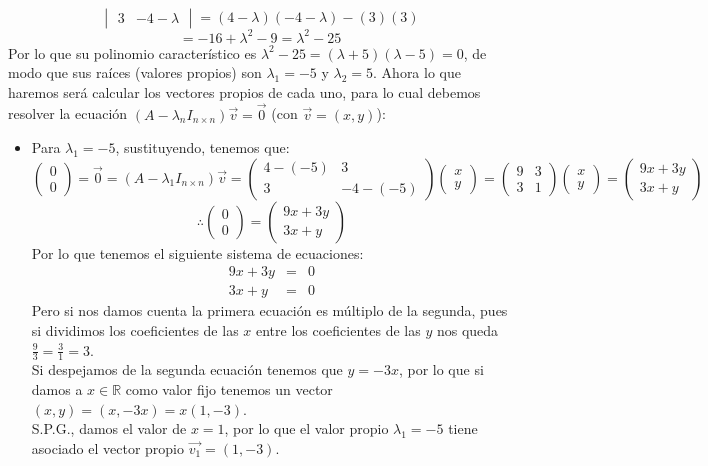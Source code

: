 \begin{itemize}
\[\begin{vmatrix}
3 &-4-\lambda\end{vmatrix}=(4-\lambda)(-4-\lambda)-(3)(3)\]\[=-16+\lambda^2-9=\lambda^2-25\]
Por lo que su polinomio caracter\'istico es $\lambda^2-25=(\lambda+5)(\lambda-5)=0$, de modo que sus ra\'ices (valores propios) son $\lambda_1=-5$ y $\lambda_2=5$. Ahora lo que haremos ser\'a calcular los vectores propios de cada uno, para lo cual debemos resolver la ecuaci\'on $(A-\lambda_nI_{n\times n })\vec{v}=\vec{0}$ (con $\vec{v}=(x,y)$):
\begin{itemize}
    \item Para $\lambda_1=-5$, sustituyendo, tenemos que:
    \[\begin{pmatrix}0\\
0\end{pmatrix}=\vec{0}=(A-\lambda_1I_{n\times n })\vec{v}=\begin{pmatrix}4-(-5) &3\\
3&-4-(-5)\end{pmatrix}\begin{pmatrix}x\\
y\end{pmatrix}=\begin{pmatrix}9 &3\\
3 &1\end{pmatrix}\begin{pmatrix}x\\
y\end{pmatrix}=\begin{pmatrix}9x+3y\\
3x+y\end{pmatrix}\]
\[\therefore \begin{pmatrix}0\\
0\end{pmatrix}=\begin{pmatrix}9x+3y\\
3x+y\end{pmatrix}\]
Por lo que tenemos el siguiente sistema de ecuaciones:
\begin{eqnarray*}
9x+3y&=&0\\
3x+y&=&0
\end{eqnarray*}
Pero si nos damos cuenta la primera ecuaci\'on es m\'ultiplo de la segunda, pues si dividimos los coeficientes de las $x$ entre los coeficientes de las $y$ nos queda $\displaystyle\frac{9}{3}=\frac{3}{1}=3$.\\
Si despejamos de la segunda ecuaci\'on tenemos que $y=-3x$, por lo que si damos a $x\in\mathbb{R}$ como valor fijo tenemos un vector $(x,y)=(x,-3x)=x(1,-3)$.\\
S.P.G., damos el valor de $x=1$, por lo que el valor propio $\lambda_1=-5$ tiene asociado el vector propio $\vec{v_1}=(1,-3)$.



\end{itemize}
\end{itemize}
